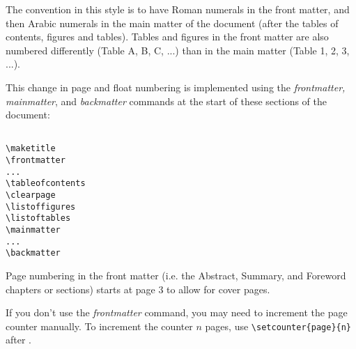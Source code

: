 The convention in this style is to have Roman numerals in the front matter, and then Arabic numerals in the main matter of the document (after the tables of contents, figures and tables). Tables and figures in the front matter are also numbered differently (Table A, B, C, ...) than in the main matter (Table 1, 2, 3, ...).

This change in page and float numbering is implemented using the \emph{frontmatter, mainmatter}, and \emph{backmatter} commands at the start of these  sections of the document:

\begin{lstlisting}

\maketitle
\frontmatter
...
\tableofcontents
\clearpage
\listoffigures
\listoftables
\mainmatter
...
\backmatter

\end{lstlisting}

Page numbering in the front matter (i.e. the Abstract, Summary, and Foreword chapters or sections) starts at page 3 to allow for cover pages.

If you don't use the \emph{frontmatter} command, you may need to increment the page counter manually. To increment the counter $n$ pages, use \verb+\setcounter{page}{n}+ after \verb++.